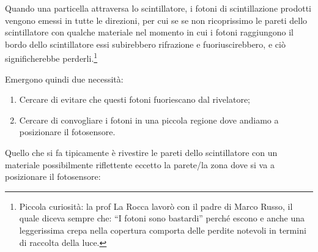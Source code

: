Quando una particella attraversa lo scintillatore, i fotoni di scintillazione prodotti vengono emessi in tutte le direzioni, per cui se se non ricoprissimo le pareti dello scintillatore con qualche materiale nel momento in cui i fotoni raggiungono il bordo dello scintillatore essi subirebbero rifrazione e fuoriuscirebbero, e ciò significherebbe perderli.\footnote{Piccola curiosità: la prof La Rocca lavorò con il padre di Marco Russo, il quale diceva sempre che: ``I fotoni sono bastardi'' perché escono e anche una leggerissima crepa nella copertura comporta delle perdite notevoli in termini di raccolta della luce.}

Emergono quindi due necessità:

\begin{enumerate}[leftmargin=0.6cm]
   \item Cercare di evitare che questi fotoni fuoriescano dal rivelatore;
   \item Cercare di convogliare i fotoni in una piccola regione dove andiamo a posizionare il fotosensore.
\end{enumerate}

Quello che si fa tipicamente è rivestire le pareti dello scintillatore con un materiale possibilmente riflettente eccetto la parete/la zona dove si va a posizionare il fotosensore:

\begin{figure}[H]
   \centering
\end{figure}

